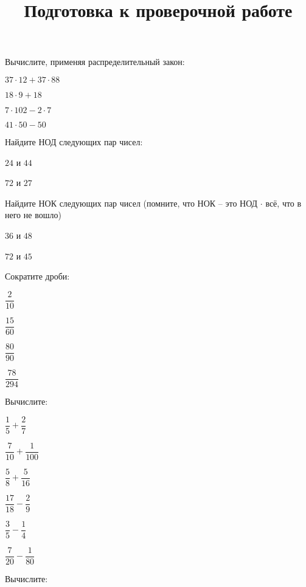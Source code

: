 \title{Подготовка к проверочной работе}
\begin{listofex}
	\item Вычислите, применяя распределительный закон:
	\begin{enumcols}[itemcolumns=4]
		\item \( 37\cdot12+37\cdot88 \)
		\item \( 18\cdot9+18\ \)
		\item \( 7\cdot102-2\cdot7 \)
		\item \( 41\cdot50-50 \)
	\end{enumcols}
	\item Найдите НОД следующих пар чисел:
	\begin{enumcols}[itemcolumns=2]
		\item \( 24 \) и \( 44 \)
		\item \( 72 \) и \( 27 \)
	\end{enumcols}
	\item Найдите НОК следующих пар чисел (помните, что НОК -- это НОД \( \cdot \) всё, что в него не вошло)
	\begin{enumcols}[itemcolumns=2]
		\item \( 36 \) и \( 48 \)
		\item \( 72 \) и \( 45 \)
	\end{enumcols}
	\item Сократите дроби:
		\begin{enumcols}[itemcolumns=4]
		\item \( \dfrac{2}{10} \)
		\item \( \dfrac{15}{60} \)
		\item \( \dfrac{80}{90} \)
		\item \( \dfrac{78}{294} \)
	\end{enumcols}
	\item Вычислите:
		\begin{enumcols}[itemcolumns=6]
		\item \( \dfrac{1}{5}+\dfrac{2}{7} \)
		\item \( \dfrac{7}{10}+\dfrac{1}{100} \)
		\item \( \dfrac{5}{8}+\dfrac{5}{16} \)
		\item \( \dfrac{17}{18}-\dfrac{2}{9} \)
		\item \( \dfrac{3}{5}-\dfrac{1}{4} \)
		\item \( \dfrac{7}{20}-\dfrac{1}{80} \)
	\end{enumcols}
	\item Вычислите:
		\begin{enumcols}[itemcolumns=4]

\end{enumcols}
\end{listofex}
